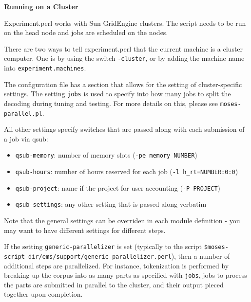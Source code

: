 \vspace{2mm}

{\bf 
\label{experiment-perl.texntoc22}Running on a Cluster}


Experiment.perl works with Sun GridEngine clusters. The script needs to be run on the head node and jobs are scheduled on the nodes. 



There are two ways to tell experiment.perl that the current machine is a cluster computer. One is by using the switch {\tt -cluster}, or by adding the machine name into {\tt experiment.machines}.



The configuration file has a section that allows for the setting of cluster-specific settings. The setting {\tt jobs} is used to specify into how many jobs to split the decoding during tuning and testing. For more details on this, please see {\tt moses-parallel.pl}. 



All other settings specify switches that are passed along with each submission of a job via qsub:

\begin{itemize}
\item {\tt qsub-memory}: number of memory slots ({\tt -pe memory NUMBER})

\item {\tt qsub-hours}: number of hours reserved for each job ({\tt -l h\_rt=NUMBER:0:0})

\item {\tt qsub-project}: name if the project for user accounting ({\tt -P PROJECT})

\item {\tt qsub-settings}: any other setting that is passed along verbatim

\end{itemize}

Note that the general settings can be overriden in each module definition - you may want to have different settings for different steps.



If the setting {\tt generic-parallelizer} is set (typically to the script {\tt \$moses-script-dir/ems/support/generic-parallelizer.perl}), then a number of additional steps are parallelized. For instance, tokenization is performed by breaking up the corpus into as many parts as specified with {\tt jobs}, jobs to process the parts are submitted in parallel to the cluster, and their output pieced together upon completion.



